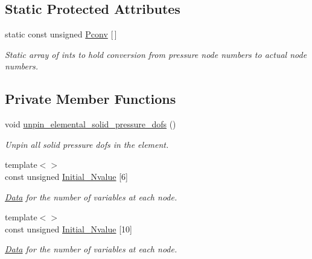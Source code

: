 \subsection*{Static Protected Attributes}
\begin{DoxyCompactItemize}
\item 
static const unsigned \hyperlink{classoomph_1_1TPVDElementWithContinuousPressure_aecd458b884165b0e0b45190459bfdfad}{Pconv} \mbox{[}$\,$\mbox{]}
\begin{DoxyCompactList}\small\item\em Static array of ints to hold conversion from pressure node numbers to actual node numbers. \end{DoxyCompactList}\end{DoxyCompactItemize}
\subsection*{Private Member Functions}
\begin{DoxyCompactItemize}
\item 
void \hyperlink{classoomph_1_1TPVDElementWithContinuousPressure_a3ca4728b1b91521fa30f008df7eb4549}{unpin\+\_\+elemental\+\_\+solid\+\_\+pressure\+\_\+dofs} ()
\begin{DoxyCompactList}\small\item\em Unpin all solid pressure dofs in the element. \end{DoxyCompactList}\item 
{\footnotesize template$<$$>$ }\\const unsigned \hyperlink{classoomph_1_1TPVDElementWithContinuousPressure_a6d6c3ea35d168d12901c7b03b5083b62}{Initial\+\_\+\+Nvalue} \mbox{[}6\mbox{]}
\begin{DoxyCompactList}\small\item\em \hyperlink{classoomph_1_1Data}{Data} for the number of variables at each node. \end{DoxyCompactList}\item 
{\footnotesize template$<$$>$ }\\const unsigned \hyperlink{classoomph_1_1TPVDElementWithContinuousPressure_ae5bcebb0597dd1cd202a5b0a2503b235}{Initial\+\_\+\+Nvalue} \mbox{[}10\mbox{]}
\begin{DoxyCompactList}\small\item\em \hyperlink{classoomph_1_1Data}{Data} for the number of variables at each node. \end{DoxyCompactList}\end{DoxyCompactItemize}
